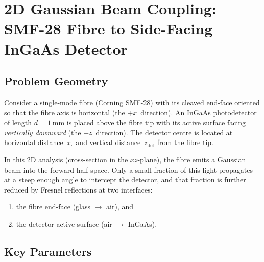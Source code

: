 
\section{2D Gaussian Beam Coupling: SMF-28 Fibre to Side-Facing InGaAs Detector}

\subsection{Problem Geometry}

Consider a single-mode fibre (Corning SMF-28) with its cleaved end-face
oriented so that the fibre axis is horizontal (the $+x$~direction).
An InGaAs photodetector of length $d = \SI{1}{\milli\metre}$ is placed
above the fibre tip with its active surface facing \emph{vertically
downward} (the $-z$~direction).  The detector centre is located at
horizontal distance~$x_c$ and vertical distance~$z_\mathrm{det}$ from
the fibre tip.

In this 2D analysis (cross-section in the $xz$-plane), the fibre emits
a Gaussian beam into the forward half-space.  Only a small fraction of
this light propagates at a steep enough angle to intercept the detector,
and that fraction is further reduced by Fresnel reflections at two
interfaces:
%
\begin{enumerate}[label=(\roman*)]
  \item the fibre end-face (glass $\to$ air), and
  \item the detector active surface (air $\to$ InGaAs).
\end{enumerate}

\subsection{Key Parameters}

